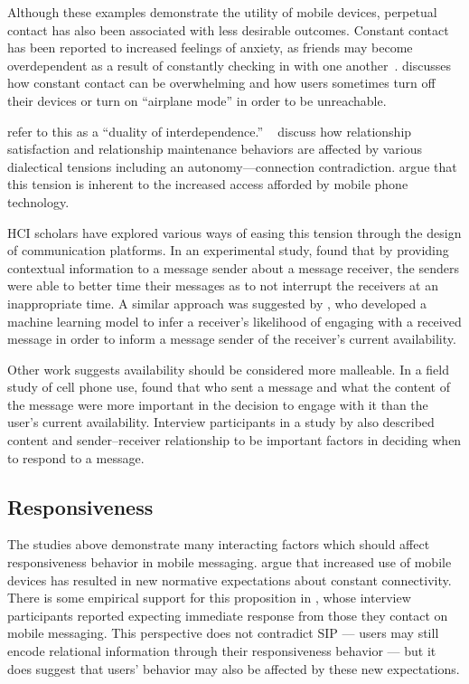 \documentclass[12pt]{nuthesis}	%
\begin{document}
Although these examples demonstrate the utility of mobile devices, perpetual contact has also been associated with less desirable outcomes. Constant contact has been reported to increased feelings of anxiety, as friends may become overdependent as a result of constantly checking in with one another~\citep{baym2015personal}. \citet{ames2013managing} discusses how constant contact can be overwhelming and how users sometimes turn off their devices or turn on ``airplane mode'' in order to be unreachable.

\citet{hall2012calling} refer to this as a ``duality of interdependence.'' ~\citet{baxter1993relationship} discuss how relationship satisfaction and relationship maintenance behaviors are affected by various dialectical tensions including an autonomy---connection contradiction. \citeauthor{hall2012calling} argue that this tension is inherent to the increased access afforded by mobile phone technology.

HCI scholars have explored various ways of easing this tension through the design of communication platforms. In an experimental study, \citet{avrahami2007improving} found that by providing contextual information to a message sender about a message receiver, the senders were able to better time their messages as to not interrupt the receivers at an inappropriate time. A similar approach was suggested by \citet{pielot2014didn}, who developed a machine learning model to infer a receiver's likelihood of engaging with a received message in order to inform a message sender of the receiver's current availability.

Other work suggests availability should be considered more malleable. In a field study of cell phone use, \citet{grandhi2010technology} found that who sent a message and what the content of the message were more important in the decision to engage with it than the user's current availability. Interview participants in a study by \citet{wohn2015ambient} also described content and sender--receiver relationship to be important factors in deciding when to respond to a message.

\subsection{Responsiveness}

The studies above demonstrate many interacting factors which should affect responsiveness behavior in mobile messaging. \citet{bayer2015connection} argue that increased use of mobile devices has resulted in new normative expectations about constant connectivity. There is some empirical support for this proposition in \citet{church2013s}, whose interview participants reported expecting immediate response from those they contact on mobile messaging. This perspective does not contradict SIP --- users may still encode relational information through their responsiveness behavior --- but it does suggest that users' behavior may also be affected by these new expectations.
\end{document}
